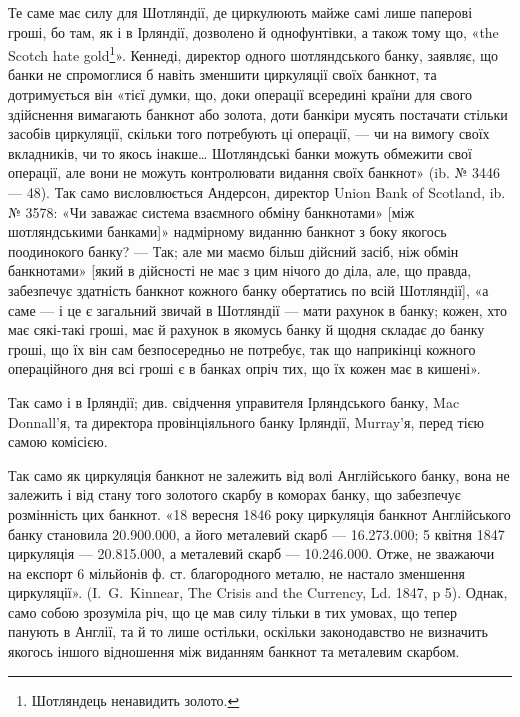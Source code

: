 Те саме має силу для Шотляндії, де циркулюють майже самі лише паперові
гроші, бо там, як і в Ірляндії, дозволено й однофунтівки, а також
тому що, «the Scotch hate gold\footnote*{
Шотляндець ненавидить золото. 
}». Кеннеді, директор одного шотляндського банку,
заявляє, що банки не спромоглися б навіть зменшити циркуляції своїх банкнот,
та дотримується він «тієї думки, що, доки операції всередині країни для свого
здійснення вимагають банкнот або золота, доти банкіри мусять постачати стільки
засобів циркуляції, скільки того потребують ці операції, — чи на вимогу своїх
вкладників, чи то якось інакше\dots{} Шотляндські банки можуть обмежити свої
операції, але вони не можуть контролювати видання своїх банкнот» (ib. № 3446 —
48). Так само висловлюється Андерсон, директор Union Bank of Scotland, ib.
№ 3578: «Чи заважає система взаємного обміну банкнотами» [між шотляндськими
банками]» надмірному виданню банкнот з боку якогось поодинокого банку? —
Так; але ми маємо більш дійсний засіб, ніж обмін банкнотами» [який в дійсності
не має з цим нічого до діла, але, що правда, забезпечує здатність банкнот кожного
банку обертатись по всій Шотляндії], «а саме — і це є загальний звичай
в Шотляндії — мати рахунок в банку; кожен, хто має сякі-такі гроші, має
й рахунок в якомусь банку й щодня складає до банку гроші, що їх він сам
безпосередньо не потребує, так що наприкінці кожного операційного дня всі
гроші є в банках опріч тих, що їх кожен має в кишені».

Так само і в Ірляндії; див. свідчення управителя Ірляндського банку,
Mac Donnall’я, та директора провінціяльного банку Ірляндії, Murray’я, перед
тією самою комісією.

Так само як циркуляція банкнот не залежить від волі Англійського банку,
вона не залежить і від стану того золотого скарбу в коморах банку, що забезпечує
розмінність цих банкнот. «18 вересня 1846 року циркуляція банкнот
Англійського банку становила \num{20.900.000}, а його металевий скарб —
\num{16.273.000}; 5 квітня 1847~ циркуляція — \num{20.815.000}, а металевий
скарб — \num{10.246.000}. Отже, не зважаючи на експорт 6 мільйонів ф. ст. благородного
металю, не настало зменшення циркуляції». (I.~G.~Kinnear, The Crisis
and the Currency, Ld. 1847, p 5). Однак, само собою зрозуміла річ, що це мав силу
тільки в тих умовах, що тепер панують в Англії, та й то лише остільки, оскільки
законодавство не визначить якогось іншого відношення між виданням банкнот
та металевим скарбом.

